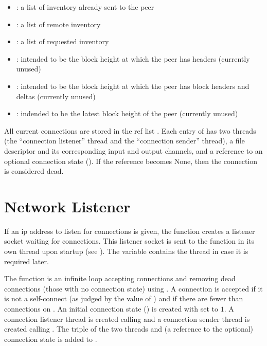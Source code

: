\begin{itemize}
\item {}: a list of inventory already sent to the peer
\item {}: a list of remote inventory
\item {}: a list of requested inventory
\item {}: intended to be the block height at which the peer has headers (currently unused)
\item {}: intended to be the block height at which the peer has block headers and deltas (currently unused)
\item {}: indended to be the latest block height of the peer (currently unused)
\end{itemize}

All current connections are stored in the ref list {}.
Each entry of {}
has two threads (the ``connection listener'' thread and the ``connection sender'' thread), a file descriptor and its corresponding input and output channels,
and a reference to an optional connection state ({}).
If the reference becomes None, then the connection is considered dead.

\section{Network Listener}

If an ip address to listen for connections is given, the function {}
creates a listener socket waiting for connections.
This listener socket is sent to the function {} in its own thread
upon startup (see {}).
The variable {} contains the thread in case it is required later.

The function {} is an infinite loop accepting connections
and
removing dead connections (those with no connection state) using {}.
A connection is accepted if it is not a self-connect (as judged by the value of {})
and if there are fewer than {} connections on {}.
An initial connection state ({}) is created with {} set to $1$.
A connection listener thread is created calling {}
and a connection sender thread is created calling {}.
The triple of the two threads and (a reference to the optional) connection state is added to {}.

